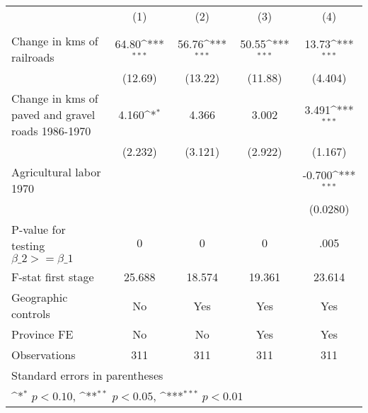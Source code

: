{
\def\sym#1{\ifmmode^{#1}\else\(^{#1}\)\fi}
\begin{tabular}{l*{4}{c}}
\hline\hline
                &\multicolumn{1}{c}{(1)}&\multicolumn{1}{c}{(2)}&\multicolumn{1}{c}{(3)}&\multicolumn{1}{c}{(4)}\\
                &\multicolumn{1}{c}{}&\multicolumn{1}{c}{}&\multicolumn{1}{c}{}&\multicolumn{1}{c}{}\\
\hline
Change in kms of railroads&    64.80\sym{***}&    56.76\sym{***}&    50.55\sym{***}&    13.73\sym{***}\\
                &  (12.69)         &  (13.22)         &  (11.88)         &  (4.404)         \\
[1em]
Change in kms of paved and gravel roads 1986-1970&    4.160\sym{*}  &    4.366         &    3.002         &    3.491\sym{***}\\
                &  (2.232)         &  (3.121)         &  (2.922)         &  (1.167)         \\
[1em]
Agricultural labor 1970&                  &                  &                  &   -0.700\sym{***}\\
                &                  &                  &                  & (0.0280)         \\
\hline
P-value for testing $\beta\_{2} >= \beta\_{1}$&        0         &        0         &        0         &     .005         \\
F-stat first stage&   25.688         &   18.574         &   19.361         &   23.614         \\
Geographic controls&       No         &      Yes         &      Yes         &      Yes         \\
Province FE     &       No         &       No         &      Yes         &      Yes         \\
Observations    &      311         &      311         &      311         &      311         \\
\hline\hline
\multicolumn{5}{l}{\footnotesize Standard errors in parentheses}\\
\multicolumn{5}{l}{\footnotesize \sym{*} \(p<0.10\), \sym{**} \(p<0.05\), \sym{***} \(p<0.01\)}\\
\end{tabular}
}
